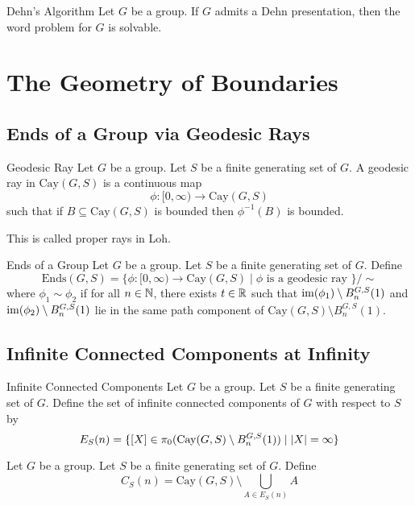 \documentclass[a4paper]{article}
\begin{document}
\begin{thm}{Dehn's Algorithm}{} Let $G$ be a group. If $G$ admits a Dehn presentation, then the word problem for $G$ is solvable. 
\end{thm}

\pagebreak
\section{The Geometry of Boundaries}
\subsection{Ends of a Group via Geodesic Rays}
\begin{defn}{Geodesic Ray}{} Let $G$ be a group. Let $S$ be a finite generating set of $G$. A geodesic ray in $\text{Cay}(G,S)$ is a continuous map $$\phi:[0,\infty)\to\text{Cay}(G,S)$$ such that if $B\subseteq\text{Cay}(G,S)$ is bounded then $\phi^{-1}(B)$ is bounded. 
\end{defn}

This is called proper rays in Loh. 

\begin{defn}{Ends of a Group}{} Let $G$ be a group. Let $S$ be a finite generating set of $G$. Define $$\text{Ends}(G,S)=\{\phi:[0,\infty)\to\text{Cay}(G,S)\;|\;\phi\text{ is a geodesic ray }\}/\sim$$ where $\phi_1\sim\phi_2$ if for all $n\in\mathbb{N}$, there exists $t\in\mathbb{R}$ such that $\operatorname{im}(\phi_1)\setminus B_n^{G,S}(1)$ and $\operatorname{im}(\phi_2)\setminus B_n^{G,S}(1)$ lie in the same path component of $\text{Cay}(G,S)\setminus B_n^{G,S}(1)$. 
\end{defn}

\subsection{Infinite Connected Components at Infinity}
\begin{defn}{Infinite Connected Components}{} Let $G$ be a group. Let $S$ be a finite generating set of $G$. Define the set of infinite connected components of $G$ with respect to $S$ by $$E_S(n)=\{[X]\in\pi_0(\text{Cay}(G,S)\setminus B_n^{G,S}(1))\;|\;\abs{X}=\infty\}$$
\end{defn}

\begin{defn}{}{} Let $G$ be a group. Let $S$ be a finite generating set of $G$. Define $$C_S(n)=\text{Cay}(G,S)\setminus\bigcup_{A\in E_S(n)}A$$
\end{defn}
\end{document}
